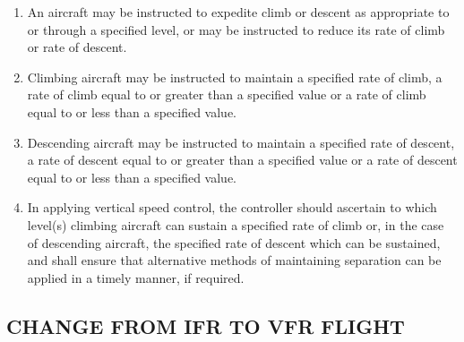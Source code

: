 \documentclass[../main.tex]{subfiles}
\begin{document}
    \begin{enumerate}
        \item An aircraft may be instructed to expedite climb or descent as appropriate to or through a specified level, or may be instructed to reduce its rate of climb or rate of descent.
        \item Climbing aircraft may be instructed to maintain a specified rate of climb, a rate of climb equal to or greater than a specified value or a rate of climb equal to or less than a specified value.
        \item Descending aircraft may be instructed to maintain a specified rate of descent, a rate of descent equal to or greater than a specified value or a rate of descent equal to or less than a specified value.
        \item In applying vertical speed control, the controller should ascertain to which level(s) climbing aircraft can sustain a specified rate of climb or, in the case of descending aircraft, the specified rate of descent which can be sustained, and shall ensure that alternative methods of maintaining separation can be applied in a timely manner, if required.

    \end{enumerate}

    \subsection[Change from IFR to VFR flight]{CHANGE FROM IFR TO VFR FLIGHT}
\end{document}
